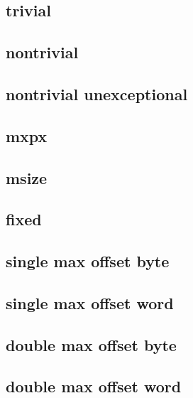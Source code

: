\subsection{trivial}                  
\subsection{nontrivial}               
\subsection{nontrivial unexceptional} 

\subsection{mxpx}                     
\subsection{msize}                    
\subsection{fixed \deprecated}        

\subsection{single max offset byte}   
\subsection{single max offset word}   

\subsection{double max offset byte}   
\subsection{double max offset word}   





